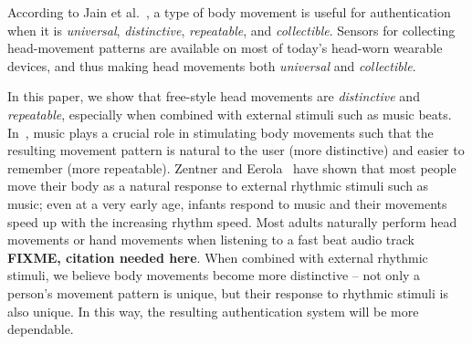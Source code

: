 
According to Jain et al.~\cite{jain2004introduction}, a type of body movement is useful for
authentication when it is \emph{universal}, \emph{distinctive},
\emph{repeatable}, and \emph{collectible}. %
Sensors for collecting head-movement patterns are
available on most of today's head-worn wearable devices, and thus
making head movements both {\em universal} and \emph{collectible}.

In this paper, we show that free-style head movements are  \emph{distinctive} and \emph{repeatable}, especially when combined with external stimuli such as music beats. In~\systemname, music plays a crucial role in stimulating body movements such that the resulting movement pattern is natural to the user (more distinctive) and easier to remember (more repeatable). Zentner and Eerola~\cite{zentner2010rhythmic} have shown that most people move
their body as a natural response to external rhythmic stimuli such as music;
even at a very early age, infants respond to music and their movements speed
up with the increasing rhythm speed. Most adults naturally perform head
movements or hand movements when listening to a fast beat audio track \textbf{FIXME, citation needed here}.  When
combined with external rhythmic stimuli, we believe body movements become more
distinctive -- not only a person's movement pattern is unique, but their
response to rhythmic stimuli is also unique. In this way, the resulting
authentication system will be more dependable.

